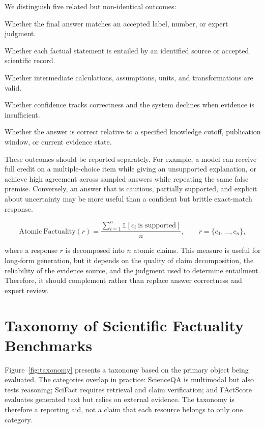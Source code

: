 \documentclass[manuscript,nonacm]{acmart}
\begin{document}
We distinguish five related but non-identical outcomes:
\begin{description}[leftmargin=*,style=nextline,itemsep=1pt]
\item[Answer correctness] Whether the final answer matches an accepted label, number, or expert judgment.
\item[Claim support] Whether each factual statement is entailed by an identified source or accepted scientific record.
\item[Reasoning validity] Whether intermediate calculations, assumptions, units, and transformations are valid.
\item[Calibration and abstention] Whether confidence tracks correctness and the system declines when evidence is insufficient.
\item[Temporal validity] Whether the answer is correct relative to a specified knowledge cutoff, publication window, or current evidence state.
\end{description}

These outcomes should be reported separately. For example, a model can receive full credit on a multiple-choice item while giving an unsupported explanation, or achieve high agreement across sampled answers while repeating the same false premise. Conversely, an answer that is cautious, partially supported, and explicit about uncertainty may be more useful than a confident but brittle exact-match response.

\begin{equation}
    \mathrm{Atomic\ Factuality}(r)=\frac{\sum_{i=1}^{n}\mathbb{1}[c_i\ \text{is supported}]}{n},
    \qquad r=\{c_1,\ldots,c_n\},
    \label{eq:factscore}
\end{equation}

where a response $r$ is decomposed into $n$ atomic claims. This measure is useful for long-form generation, but it depends on the quality of claim decomposition, the reliability of the evidence source, and the judgment used to determine entailment. Therefore, it should complement rather than replace answer correctness and expert review.

\section{Taxonomy of Scientific Factuality Benchmarks}\label{sec:taxonomy}
Figure~\ref{fig:taxonomy} presents a taxonomy based on the primary object being evaluated. The categories overlap in practice: ScienceQA is multimodal but also tests reasoning; SciFact requires retrieval and claim verification; and FActScore evaluates generated text but relies on external evidence. The taxonomy is therefore a reporting aid, not a claim that each resource belongs to only one category.
\end{document}
